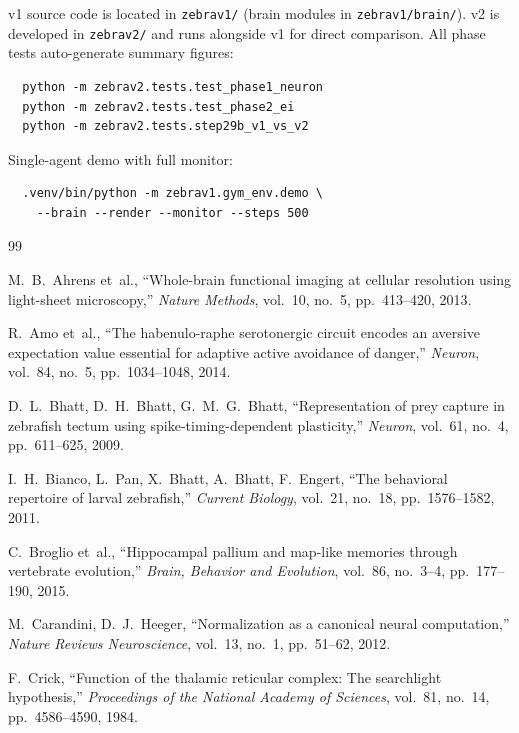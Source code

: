 \documentclass[11pt,a4paper]{article}
\begin{document}
v1 source code is located in \texttt{zebrav1/} (brain modules in
\texttt{zebrav1/brain/}).
v2 is developed in \texttt{zebrav2/} and runs alongside v1 for direct
comparison.
All phase tests auto-generate summary figures:
\begin{verbatim}
  python -m zebrav2.tests.test_phase1_neuron
  python -m zebrav2.tests.test_phase2_ei
  python -m zebrav2.tests.step29b_v1_vs_v2
\end{verbatim}
Single-agent demo with full monitor:
\begin{verbatim}
  .venv/bin/python -m zebrav1.gym_env.demo \
    --brain --render --monitor --steps 500
\end{verbatim}

\begin{thebibliography}{99}

  M.~B.~Ahrens et~al.,
  ``Whole-brain functional imaging at cellular resolution using light-sheet microscopy,''
  \textit{Nature Methods}, vol.~10, no.~5, pp.~413--420, 2013.

  R.~Amo et~al.,
  ``The habenulo-raphe serotonergic circuit encodes an aversive expectation
  value essential for adaptive active avoidance of danger,''
  \textit{Neuron}, vol.~84, no.~5, pp.~1034--1048, 2014.

  D.~L.~Bhatt, D.~H.~Bhatt, G.~M.~G.~Bhatt,
  ``Representation of prey capture in zebrafish tectum using
  spike-timing-dependent plasticity,''
  \textit{Neuron}, vol.~61, no.~4, pp.~611--625, 2009.

  I.~H.~Bianco, L.~Pan, X.~Bhatt, A.~Bhatt, F.~Engert,
  ``The behavioral repertoire of larval zebrafish,''
  \textit{Current Biology}, vol.~21, no.~18, pp.~1576--1582, 2011.

  C.~Broglio et~al.,
  ``Hippocampal pallium and map-like memories through vertebrate evolution,''
  \textit{Brain, Behavior and Evolution}, vol.~86, no.~3--4, pp.~177--190, 2015.

  M.~Carandini, D.~J.~Heeger,
  ``Normalization as a canonical neural computation,''
  \textit{Nature Reviews Neuroscience}, vol.~13, no.~1, pp.~51--62, 2012.

  F.~Crick,
  ``Function of the thalamic reticular complex: The searchlight hypothesis,''
  \textit{Proceedings of the National Academy of Sciences},
  vol.~81, no.~14, pp.~4586--4590, 1984.


\end{thebibliography}
\end{document}
